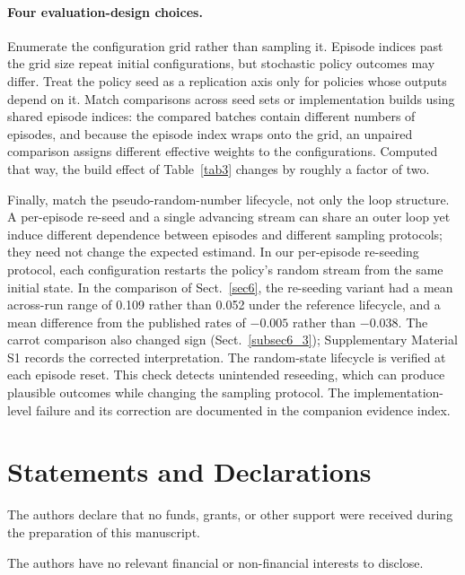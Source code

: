 \documentclass[pdflatex,iicol,sn-apa]{sn-jnl}
\theoremstyle{remark}
\begin{document}
\begin{appendices}
\paragraph{Four evaluation-design choices.}
Enumerate the configuration grid
rather than sampling it. Episode indices past the grid size repeat initial configurations,
but stochastic policy outcomes may differ. Treat the policy seed
as a replication axis only for policies whose outputs depend on it. Match comparisons across seed sets or implementation builds using
shared episode indices: the compared batches contain different numbers of episodes, and because the episode
index wraps onto the grid, an unpaired comparison assigns different effective weights to the configurations.
Computed that way, the build effect of Table~\ref{tab3} changes by roughly a factor of two.

Finally, match the pseudo-random-number lifecycle, not only the loop structure. A per-episode
re-seed and a single advancing stream can share an outer loop yet induce different dependence
between episodes and different sampling protocols; they need not change the expected estimand.
In our per-episode re-seeding protocol, each configuration restarts the policy's random stream
from the same initial state. In the comparison of
Sect.~\ref{sec6}, the re-seeding variant had a mean across-run range of 0.109 rather than
0.052 under the reference lifecycle, and a mean difference from the published rates of
$-0.005$ rather than $-0.038$. The carrot comparison also changed sign
(Sect.~\ref{subsec6_3}); Supplementary Material S1 records the corrected interpretation. The random-state lifecycle is verified at each episode reset. This check detects unintended reseeding, which can produce plausible outcomes while changing the sampling protocol. The implementation-level failure and its correction are documented in the companion evidence index.

\end{appendices}



\section*{Statements and Declarations}

The authors declare that no funds, grants, or other support were received during the preparation of
this manuscript.

The authors have no relevant financial or non-financial interests to disclose.
\end{document}
